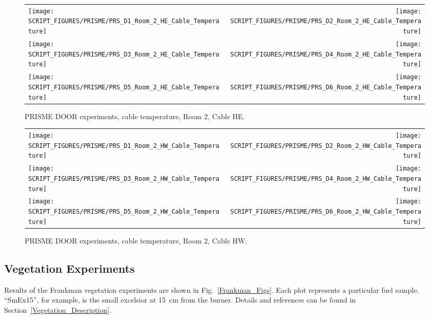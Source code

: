 \begin{figure}[p]
\begin{tabular*}{\textwidth}{l@{\extracolsep{\fill}}r}
\texttt{[image: SCRIPT\_FIGURES/PRISME/PRS\_D1\_Room\_2\_HE\_Cable\_Temperature]} &
\texttt{[image: SCRIPT\_FIGURES/PRISME/PRS\_D2\_Room\_2\_HE\_Cable\_Temperature]} \\
\texttt{[image: SCRIPT\_FIGURES/PRISME/PRS\_D3\_Room\_2\_HE\_Cable\_Temperature]} &
\texttt{[image: SCRIPT\_FIGURES/PRISME/PRS\_D4\_Room\_2\_HE\_Cable\_Temperature]} \\
\texttt{[image: SCRIPT\_FIGURES/PRISME/PRS\_D5\_Room\_2\_HE\_Cable\_Temperature]} &
\texttt{[image: SCRIPT\_FIGURES/PRISME/PRS\_D6\_Room\_2\_HE\_Cable\_Temperature]}
\end{tabular*}
\caption[PRISME DOOR experiments, cable temperature, Room 2, Cable HE]{PRISME DOOR experiments, cable temperature, Room 2, Cable HE.}
\label{PRISME_HE_Cable_Room_2}
\end{figure}

\begin{figure}[p]
\begin{tabular*}{\textwidth}{l@{\extracolsep{\fill}}r}
\texttt{[image: SCRIPT\_FIGURES/PRISME/PRS\_D1\_Room\_2\_HW\_Cable\_Temperature]} &
\texttt{[image: SCRIPT\_FIGURES/PRISME/PRS\_D2\_Room\_2\_HW\_Cable\_Temperature]} \\
\texttt{[image: SCRIPT\_FIGURES/PRISME/PRS\_D3\_Room\_2\_HW\_Cable\_Temperature]} &
\texttt{[image: SCRIPT\_FIGURES/PRISME/PRS\_D4\_Room\_2\_HW\_Cable\_Temperature]} \\
\texttt{[image: SCRIPT\_FIGURES/PRISME/PRS\_D5\_Room\_2\_HW\_Cable\_Temperature]} &
\texttt{[image: SCRIPT\_FIGURES/PRISME/PRS\_D6\_Room\_2\_HW\_Cable\_Temperature]}
\end{tabular*}
\caption[PRISME DOOR experiments, cable temperature, Room 2, Cable HW]{PRISME DOOR experiments, cable temperature, Room 2, Cable HW.}
\label{PRISME_HW_Cable_Room_2}
\end{figure}


\clearpage

\subsection{Vegetation Experiments}

Results of the Frankman vegetation experiments are shown in Fig.~\ref{Frankman_Figs}. Each plot represents a particular fuel sample. ``SmEx15'', for example, is the small excelsior at 15~cm from the burner. Details and references can be found in Section~\ref{Vegetation_Description}.

